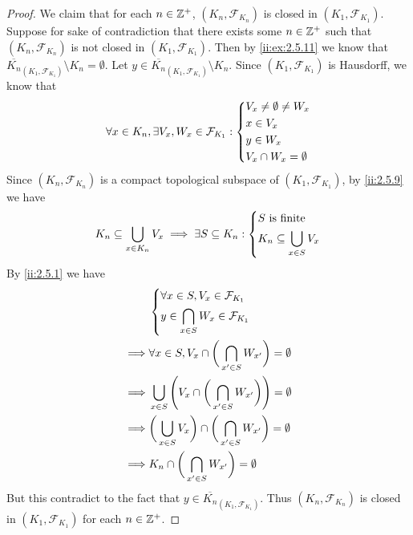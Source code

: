 \begin{proof}
  We claim that for each \(n \in \mathbb{Z}^+\), \((K_n, \mathcal{F}_{K_n})\) is closed in \((K_1, \mathcal{F}_{K_1})\).
  Suppose for sake of contradiction that there exists some \(n \in \mathbb{Z}^+\) such that \((K_n, \mathcal{F}_{K_n})\) is not closed in \((K_1, \mathcal{F}_{K_1})\).
  Then by \cref{ii:ex:2.5.11} we know that \(\overline{K_n}_{(K_1, \mathcal{F}_{K_1})} \setminus K_n = \emptyset\).
  Let \(y \in \overline{K_n}_{(K_1, \mathcal{F}_{K_1})} \setminus K_n\).
  Since \((K_1, \mathcal{F}_{K_1})\) is Hausdorff, we know that
  \[
    \forall x \in K_n, \exists V_x, W_x \in \mathcal{F}_{K_1} : \begin{dcases}
      V_x \neq \emptyset \neq W_x \\
      x \in V_x                   \\
      y \in W_x                   \\
      V_x \cap W_x = \emptyset
    \end{dcases}
  \]
  Since \((K_n, \mathcal{F}_{K_n})\) is a compact topological subspace of \((K_1, \mathcal{F}_{K_1})\), by \cref{ii:2.5.9} we have
  \[
    K_n \subseteq \bigcup_{x \in K_n} V_x \implies \exists S \subseteq K_n : \begin{dcases}
      S \text{ is finite} \\
      K_n \subseteq \bigcup_{x \in S} V_x
    \end{dcases}
  \]
  By \cref{ii:2.5.1} we have
  \begin{align*}
             & \begin{dcases}
                 \forall x \in S, V_x \in \mathcal{F}_{K_1} \\
                 y \in \bigcap_{x \in S} W_x \in \mathcal{F}_{K_1}
               \end{dcases}                                         \\
    \implies & \forall x \in S, V_x \cap \bigg(\bigcap_{x' \in S} W_{x'}\bigg) = \emptyset              \\
    \implies & \bigcup_{x \in S} \Bigg(V_x \cap \bigg(\bigcap_{x' \in S} W_{x'}\bigg)\Bigg) = \emptyset \\
    \implies & \bigg(\bigcup_{x \in S} V_x\bigg) \cap \bigg(\bigcap_{x' \in S} W_{x'}\bigg) = \emptyset \\
    \implies & K_n \cap \bigg(\bigcap_{x' \in S} W_{x'}\bigg) = \emptyset
  \end{align*}
  But this contradict to the fact that \(y \in \overline{K_n}_{(K_1, \mathcal{F}_{K_1})}\).
  Thus \((K_n, \mathcal{F}_{K_n})\) is closed in \((K_1, \mathcal{F}_{K_1})\) for each \(n \in \mathbb{Z}^+\).


\end{proof}
